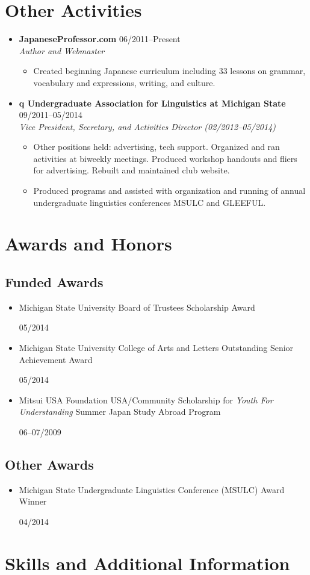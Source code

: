 \documentclass[10pt,oneside]{article}
\newcommand{\ressection}[1]{
	\vspace{-12pt}
	\section*{#1}
}
\newcommand{\ressubsection}[1]{
	\subsection*{#1}
	\vspace{-4pt}
}
\newcommand{\resitem}[2]{
	\item \parbox[t]{0.8\textwidth}{#1} \hfill #2
}
\newcommand{\resbigitem}[4]{
	\item
	\textbf{#1} \hfill #2 \\
	\textit{#3} \hfill \textit{#4}
}
\begin{document}
\ressection{Other Activities}

\begin{itemize}
	\resbigitem{JapaneseProfessor.com}
		{06/2011--Present}
		{Author and Webmaster}
		{}
	\begin{itemize}
		\item{Created beginning Japanese curriculum including 33 lessons on grammar, vocabulary and expressions, writing, and culture.}
	\end{itemize}
	
	\resbigitem{q Undergraduate Association for Linguistics at Michigan State}
		{09/2011--05/2014}
		{Vice President, Secretary, and Activities Director (02/2012--05/2014)}
		{}
	\begin{itemize}
		\item{Other positions held: advertising, tech support. Organized and ran activities at biweekly meetings. Produced workshop handouts and fliers for advertising. Rebuilt and maintained club website.}
		\item{Produced programs and assisted with organization and running of annual undergraduate linguistics conferences MSULC and GLEEFUL. }
	\end{itemize}
\end{itemize}


\ressection{Awards and Honors}
	
\ressubsection{Funded Awards}
\begin{itemize}
	\resitem{Michigan State University Board of Trustees Scholarship Award}{05/2014}
	\resitem{Michigan State University College of Arts and Letters Outstanding Senior Achievement Award}{05/2014}
	\resitem{Mitsui USA Foundation USA/Community Scholarship for \emph{Youth For Understanding} Summer Japan Study Abroad Program}{06--07/2009}
\end{itemize}

\ressubsection{Other Awards}
\begin{itemize}
	\resitem{Michigan State Undergraduate Linguistics Conference (MSULC) Award Winner}{04/2014}
\end{itemize}

%

\ressection{Skills and Additional Information}
\end{document}
